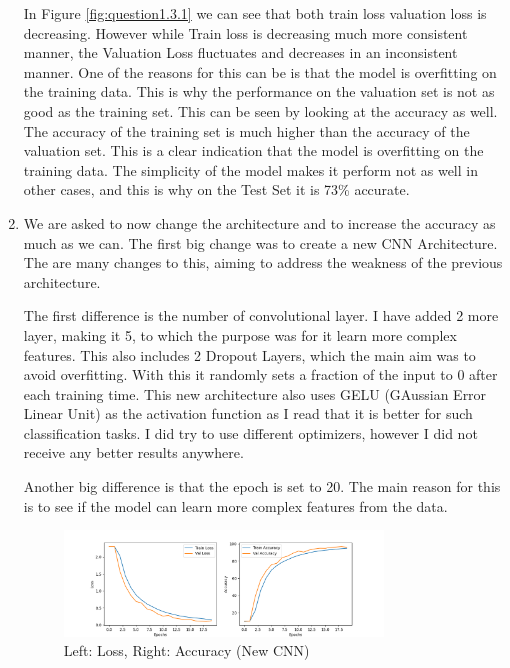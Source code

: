 \documentclass[a4paper]{article}
\begin{document}
\begin{enumerate}
	      In Figure \ref{fig:question1.3.1} we can see that both train loss valuation loss is decreasing. However while Train loss is decreasing much more consistent manner, the Valuation Loss fluctuates and decreases in an inconsistent manner. One of the reasons for this can be is that the model is overfitting on the training data. This is why the performance on the valuation set is not as good as the training set. This can be seen by looking at the accuracy as well. The accuracy of the training set is much higher than the accuracy of the valuation set. This is a clear indication that the model is overfitting on the training data. The simplicity of the model makes it perform not as well in other cases, and this is why on the Test Set it is 73\% accurate.

	\item  We are asked to now change the architecture and to increase the accuracy as much as we can. The first big change was to create a new CNN Architecture. The are many changes to this, aiming to address the weakness of the previous architecture.

	      The first difference is the number of convolutional layer. I have added 2 more layer, making it 5, to which the purpose was for it learn more complex features. This also includes 2 Dropout Layers, which the main aim was to avoid overfitting. With this it randomly sets a fraction of the input to 0 after each training time. This new architecture also uses GELU (GAussian Error Linear Unit) as the activation function as I read that it is better for such classification tasks. I did try to use different optimizers, however I did not receive any better results anywhere.

	      Another big difference is that the epoch is set to 20. The main reason for this is to see if the model can learn more complex features from the data.

		  \begin{figure}[H]
			\centering
			\includegraphics[width=0.8\textwidth]{"../figures/1.4/loss_accuracy.png"}
			\caption{Left: Loss, Right: Accuracy (New CNN)}
			\label{fig:question1.4.1}
		\end{figure}


\end{enumerate}
\end{document}
